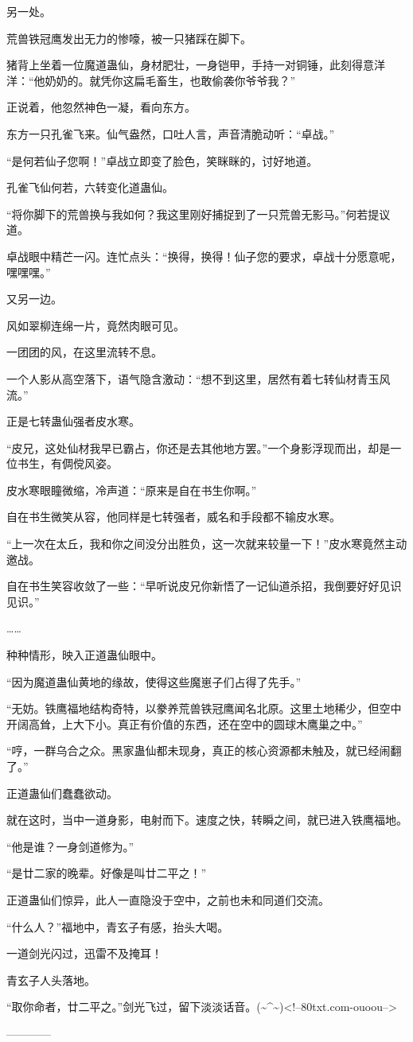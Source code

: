 \begin{this_body}
另一处。

荒兽铁冠鹰发出无力的惨嚎，被一只猪踩在脚下。

猪背上坐着一位魔道蛊仙，身材肥壮，一身铠甲，手持一对铜锤，此刻得意洋洋：“他奶奶的。就凭你这扁毛畜生，也敢偷袭你爷爷我？”

正说着，他忽然神色一凝，看向东方。

东方一只孔雀飞来。仙气盎然，口吐人言，声音清脆动听：“卓战。”

“是何若仙子您啊！”卓战立即变了脸色，笑眯眯的，讨好地道。

孔雀飞仙何若，六转变化道蛊仙。

“将你脚下的荒兽换与我如何？我这里刚好捕捉到了一只荒兽无影马。”何若提议道。

卓战眼中精芒一闪。连忙点头：“换得，换得！仙子您的要求，卓战十分愿意呢，嘿嘿嘿。”

又另一边。

风如翠柳连绵一片，竟然肉眼可见。

一团团的风，在这里流转不息。

一个人影从高空落下，语气隐含激动：“想不到这里，居然有着七转仙材青玉风流。”

正是七转蛊仙强者皮水寒。

“皮兄，这处仙材我早已霸占，你还是去其他地方罢。”一个身影浮现而出，却是一位书生，有倜傥风姿。

皮水寒眼瞳微缩，冷声道：“原来是自在书生你啊。”

自在书生微笑从容，他同样是七转强者，威名和手段都不输皮水寒。

“上一次在太丘，我和你之间没分出胜负，这一次就来较量一下！”皮水寒竟然主动邀战。

自在书生笑容收敛了一些：“早听说皮兄你新悟了一记仙道杀招，我倒要好好见识见识。”

……

种种情形，映入正道蛊仙眼中。

“因为魔道蛊仙黄地的缘故，使得这些魔崽子们占得了先手。”

“无妨。铁鹰福地结构奇特，以豢养荒兽铁冠鹰闻名北原。这里土地稀少，但空中开阔高耸，上大下小。真正有价值的东西，还在空中的圆球木鹰巢之中。”

“哼，一群乌合之众。黑家蛊仙都未现身，真正的核心资源都未触及，就已经闹翻了。”

正道蛊仙们蠢蠢欲动。

就在这时，当中一道身影，电射而下。速度之快，转瞬之间，就已进入铁鹰福地。

“他是谁？一身剑道修为。”

“是廿二家的晚辈。好像是叫廿二平之！”

正道蛊仙们惊异，此人一直隐没于空中，之前也未和同道们交流。

“什么人？”福地中，青玄子有感，抬头大喝。

一道剑光闪过，迅雷不及掩耳！

青玄子人头落地。

“取你命者，廿二平之。”剑光飞过，留下淡淡话音。(\~{}\^{}\~{})<!--80txt.com-ouoou-->

------------

\end{this_body}

